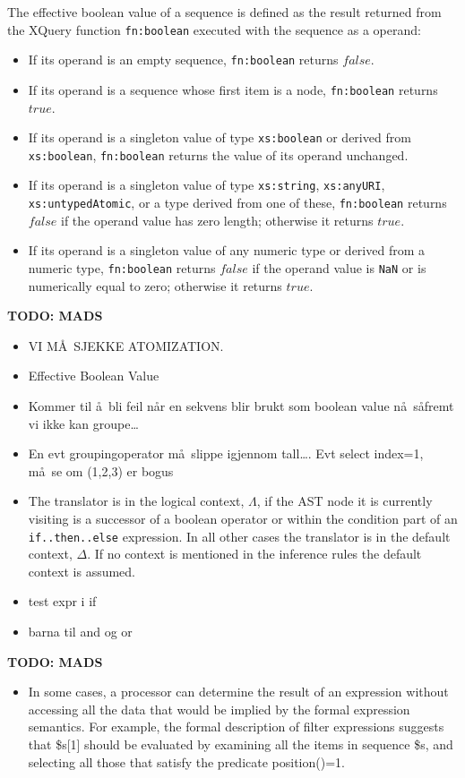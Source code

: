 The effective boolean value of a sequence is defined as the result returned from the XQuery function
\texttt{fn:boolean} executed with the sequence as a operand:
\begin{itemize}
  \item If its operand is an empty sequence, \texttt{fn:boolean} returns $false$.
  \item If its operand is a sequence whose first item is a node, \texttt{fn:boolean} returns $true$.
  \item If its operand is a singleton value of type \texttt{xs:boolean} or derived from \texttt{xs:boolean},
  \texttt{fn:boolean} returns the value of its operand unchanged.
  \item If its operand is a singleton value of type \texttt{xs:string}, \texttt{xs:anyURI},
  \texttt{xs:untypedAtomic}, or a type derived from one of these, \texttt{fn:boolean} returns $false$ if the
  operand value has zero length; otherwise it returns $true$.
  \item If its operand is a singleton value of any numeric type or derived from a numeric type,
  \texttt{fn:boolean} returns $false$ if the operand value is \texttt{NaN} or is numerically equal to zero;
  otherwise it returns $true$.
\end{itemize}



\textbf{\LARGE TODO: {MADS}}
\begin{itemize}
\item VI M\AA~SJEKKE ATOMIZATION.
\item Effective Boolean Value
\item Kommer til \aa~bli feil n\aa r en sekvens blir brukt som boolean value n\aa~s\aa fremt vi ikke kan groupe\ldots
\item En evt groupingoperator m\aa~slippe igjennom tall\ldots. Evt select index=1, m\aa~se om (1,2,3) er bogus
\item The translator is in the logical context, $\Lambda$, if the AST node it is currently visiting is a successor
of a boolean operator or within the condition part of an \texttt{if..then..else} expression. In all other cases the
translator is in the default context, $\Delta$. If no context is mentioned in the inference rules the default
context is assumed. 
\item test expr i if
\item barna til and og or
\end{itemize}

\textbf{\LARGE TODO: {MADS}}
\begin{itemize} 
   \item In some cases, a processor can determine the result of an expression without accessing all the data that
   would be implied by the formal expression semantics. For example, the formal description of filter expressions
   suggests that \$s[1] should be evaluated by examining all the items in sequence \$s, and selecting all those
   that satisfy the predicate position()=1.
\end{itemize}

